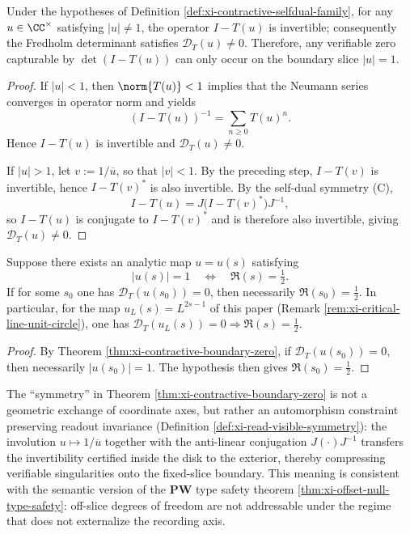 \begin{theorem}\label{thm:xi-contractive-boundary-zero}
Under the hypotheses of Definition \ref{def:xi-contractive-selfdual-family}, for any \(u\in\CC^\times\) satisfying \(|u|\neq 1\), the operator \(I-T(u)\) is invertible; consequently the Fredholm determinant satisfies \(\mathcal{D}_T(u)\neq 0\).
Therefore, any verifiable zero capturable by \(\det(I-T(u))\) can only occur on the boundary slice \(|u|=1\).
\end{theorem}

\begin{proof}
If \(|u|<1\), then \(\norm{T(u)}<1\) implies that the Neumann series converges in operator norm and yields
\[
(I-T(u))^{-1}=\sum_{n\ge 0}T(u)^{n}.
\]
Hence \(I-T(u)\) is invertible and \(\mathcal{D}_T(u)\neq 0\).
\par
If \(|u|>1\), let \(v:=1/\overline u\), so that \(|v|<1\).
By the preceding step, \(I-T(v)\) is invertible, hence \(I-T(v)^{*}\) is also invertible.
By the self-dual symmetry (C),
\[
I-T(u)=J\bigl(I-T(v)^{*}\bigr)J^{-1},
\]
so \(I-T(u)\) is conjugate to \(I-T(v)^{*}\) and is therefore also invertible, giving \(\mathcal{D}_T(u)\neq 0\). \qedhere
\end{proof}

\begin{corollary}\label{cor:xi-contractive-critical-slice-rigidity}
Suppose there exists an analytic map \(u=u(s)\) satisfying
\[
|u(s)|=1\quad\Longleftrightarrow\quad \Re(s)=\tfrac12.
\]
If for some \(s_0\) one has \(\mathcal{D}_T(u(s_0))=0\), then necessarily \(\Re(s_0)=\tfrac12\).
In particular, for the map \(u_L(s)=L^{2s-1}\) of this paper (Remark \ref{rem:xi-critical-line-unit-circle}), one has \(\mathcal{D}_T(u_L(s))=0\Rightarrow \Re(s)=\tfrac12\).
\end{corollary}

\begin{proof}
By Theorem \ref{thm:xi-contractive-boundary-zero}, if \(\mathcal{D}_T(u(s_0))=0\), then necessarily \(|u(s_0)|=1\). The hypothesis then gives \(\Re(s_0)=\tfrac12\). \qedhere
\end{proof}

\begin{remark}\label{rem:xi-symmetry-object-autread}
The ``symmetry'' in Theorem \ref{thm:xi-contractive-boundary-zero} is not a geometric exchange of coordinate axes, but rather an automorphism constraint preserving readout invariance (Definition \ref{def:xi-read-visible-symmetry}):
the involution \(u\mapsto 1/\overline u\) together with the anti-linear conjugation \(J(\cdot)J^{-1}\) transfers the invertibility certified inside the disk to the exterior, thereby compressing verifiable singularities onto the fixed-slice boundary.
This meaning is consistent with the semantic version of the \(\mathbf{PW}\) type safety theorem \ref{thm:xi-offset-null-type-safety}: off-slice degrees of freedom are not addressable under the regime that does not externalize the recording axis.
\end{remark}

